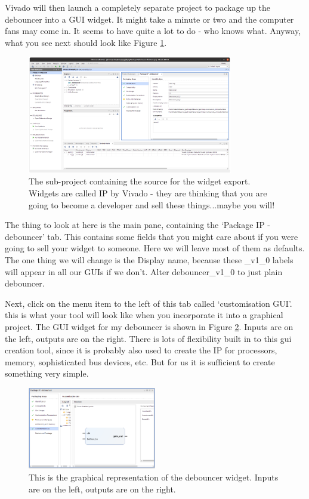 \documentclass[../physical_computing.tex]{subfiles}
\begin{document}
Vivado will then launch a completely separate project to package up the debouncer into a GUI widget. It might take a minute or two and the computer fans may come in. It seems to have quite a lot to do - who knows what. Anyway, what you see next should look like Figure \ref{fig:makeguiscreen1}.

\begin{figure}[htbp]
    \centering
    \includegraphics[width=0.8\textwidth]{appendix_5/figures/makeguiscreen1.png}
    \caption{The sub-project containing the source for the widget export. Widgets are called IP by Vivado - they are thinking that you are going to become a developer and sell these things...maybe you will!}
    \label{fig:makeguiscreen1}
\end{figure}

The thing to look at here is the main pane, containing the `Package IP - debouncer' tab. This contains some fields that you might care about if you were going to sell your widget to someone. Here we will leave most of them as defaults. The one thing we will change is the Display name, because these \_v1\_0 labels will appear in all our GUIs if we don't. Alter debouncer\_v1\_0 to just plain debouncer.

Next, click on the menu item to the left of this tab called `customisation GUI'. this is what your tool will look like when you incorporate it into a graphical project. The GUI widget for my debouncer is shown in Figure \ref{fig:debouncergui}. Inputs are on the left, outputs are on the right. There is lots of flexibility built in to this gui creation tool, since it is probably also used to create the IP for processors, memory, sophisticated bus devices, etc. But for us it is sufficient to create something very simple. 

\begin{figure}[htbp]
    \centering
    \includegraphics[width=0.5\textwidth]{appendix_5/figures/justmywidget.png}
    \caption{This is the graphical representation of the debouncer widget. Inputs are on the left, outputs are on the right.}
    \label{fig:debouncergui}
\end{figure}
\end{document}
